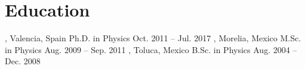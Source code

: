 \section{Education}

%
{\UVval, Valencia, Spain}%
{Ph.D. in Physics}%
{Oct. 2011 -- Jul. 2017}%
{}%
{}
\cventry{}%
{\UMSNHes, Morelia, Mexico}%
{M.Sc. in Physics}%
{Aug. 2009 -- Sep. 2011}%
{}%
{}
%
{\UAEMes, Toluca, Mexico}%
{B.Sc. in Physics}%
{Aug. 2004 -- Dec. 2008}
{}%
{}
